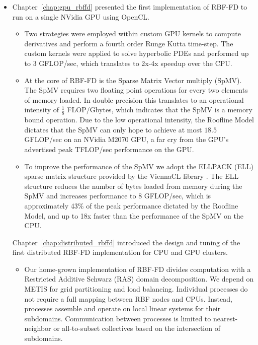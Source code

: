 \begin{itemize}
\item Chapter~\ref{chap:gpu_rbffd} presented the first implementation of RBF-FD to run on a single NVidia GPU using OpenCL. 
\begin{itemize} 

\item Two strategies were employed within custom GPU kernels to compute derivatives and perform a fourth order Runge Kutta time-step. The custom kernels were applied to solve hyperbolic PDEs and performed up to 3 GFLOP/sec, which translates to 2x-4x speedup over the CPU. 

\item  At the core of RBF-FD is the Sparse Matrix Vector multiply (SpMV). The SpMV requires two floating point operations for every two elements of memory loaded. In double precision this translates to an operational intensity of $\frac{1}{8}$ FLOP/Gbytes, which indicates that the SpMV is a memory bound operation. Due to the low operational intensity, the Roofline Model \cite{Williams2009} dictates that the SpMV can only hope to achieve at most $18.5$ GFLOP/sec on an NVidia M2070 GPU, a far cry from the GPU's advertised peak TFLOP/sec performance on the GPU. 

\item To improve the performance of the SpMV we adopt the ELLPACK (ELL) sparse matrix structure provided by the ViennaCL library \cite{Rupp2010}. The ELL structure reduces the number of bytes loaded from memory during the SpMV and increases performance to 8 GFLOP/sec, which is approximately 43\% of the peak performance dictated by the Roofline Model, and up to 18x faster than the performance of the SpMV on the CPU. 


\end{itemize}

Chapter~\ref{chap:distributed_rbffd} introduced the design and tuning of the first distributed RBF-FD implementation for CPU and GPU clusters.
\begin{itemize} 
\item Our home-grown implementation of RBF-FD divides computation with a Restricted Additive Schwarz (RAS) domain decomposition. We depend on METIS \cite{Karypis1999} for grid partitioning and load balancing. Individual processes do not require a full mapping between RBF nodes and CPUs. Instead, processes assemble and operate on local linear systems for their subdomains. Communication between processes is limited to nearest-neighbor or all-to-subset collectives based on the intersection of subdomains.


\end{itemize}
\end{itemize}
